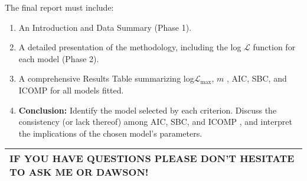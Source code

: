 \documentclass[12pt,thmsa]{article}
\begin{document}
The final report must include:

\smallskip 

\begin{enumerate}
\item An Introduction and Data Summary (Phase 1).

\item A detailed presentation of the methodology, including the log $%
\mathcal{L}$ function for each model (Phase 2).

\item A comprehensive Results Table summarizing log$\mathcal{L}_{\max }$, $m$%
, AIC, SBC, and ICOMP for all  models fitted.

\item \textbf{Conclusion:} Identify the model selected by each criterion.
Discuss the consistency (or lack thereof) among AIC, SBC, and $\text{ICOMP}$%
, and interpret the implications of the chosen model's parameters.
\end{enumerate}

\smallskip

\begin{center}
\begin{tabular}{|l|}
\hline
IF YOU HAVE QUESTIONS PLEASE DON'T HESITATE TO ASK ME OR DAWSON! \\ \hline
\end{tabular}
\end{center}
\end{document}
